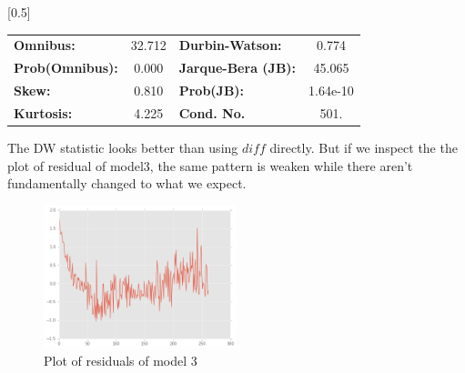 \documentclass{beamer}
\begin{document}
\begin{frame}
\begin{center}
{\begin{tabular}{lccccc}
\bottomrule
\end{tabular}
}
\scalebox{0.5}[0.5]{
\begin{tabular}{lclc}
\toprule
\textbf{Omnibus:}       & 32.712 & \textbf{  Durbin-Watson:     } &    0.774  \\
\textbf{Prob(Omnibus):} &  0.000 & \textbf{  Jarque-Bera (JB):  } &   45.065  \\
\textbf{Skew:}          &  0.810 & \textbf{  Prob(JB):          } & 1.64e-10  \\
\textbf{Kurtosis:}      &  4.225 & \textbf{  Cond. No.          } &     501.  \\
\bottomrule
\end{tabular}
}
\end{center}

\end{frame}

\begin{frame}

The DW statistic looks better than using $diff$ directly. But if we inspect the the plot of residual of model3, 
the same pattern is weaken while there aren't fundamentally changed to what we expect.

\begin{figure}[h]
\includegraphics[width=0.5\textwidth, inner]{model3-resid.png}
\caption{Plot of residuals of model 3}
\end{figure}

\end{frame}
\end{document}
